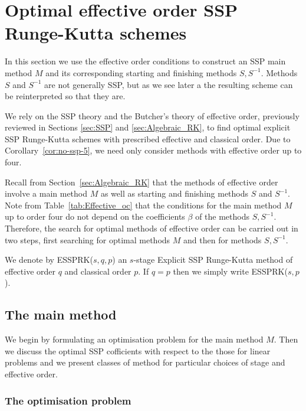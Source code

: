 \section{Optimal effective order SSP Runge-Kutta schemes}\label{sec:Optimal_ESSPRK}
In this section we use the effective order conditions to
construct an SSP main method $M$ and its corresponding starting and finishing
methods $S,S^{-1}$.  Methods $S$ and $S^{-1}$ are not generally SSP, but as we see later a the resulting scheme can be reinterpreted so that they are.

We rely on the SSP theory and the Butcher's theory of effective order,
previously reviewed in Sections \ref{sec:SSP} and \ref{sec:Algebraic_RK}, to
find optimal explicit SSP Runge-Kutta schemes with prescribed effective and classical order.  Due to Corollary~\ref{cor:no-ssp-5}, we need only consider methods with effective order 
up to four.

Recall from Section~\ref{sec:Algebraic_RK} that the methods of effective order involve
a main method $M$ as well as starting and finishing methods $S$ and $S^{-1}$.
Note from Table~\ref{tab:Effective_oc} that the conditions for the main method $M$
up to order four do not depend on the coefficients $\beta$ of the methods $S,S^{-1}$. 
Therefore, the search for optimal methods of effective order can be carried out in
two steps, first searching for optimal methods $M$ and then for methods $S,S^{-1}$.


We denote by ESSPRK($s,q,p$) an $s$-stage Explicit SSP Runge-Kutta method of
effective order $q$ and classical order $p$. If $q=p$ then we simply write ESSPRK($s,p$). 

\subsection{The main method}\label{subsection3.1}

We begin by formulating an optimisation problem for the main method $M$. Then we discuss 
the optimal SSP cofficients with respect to the those for linear problems and we present classes of method for particular choices of stage and effective order.

\subsubsection{The optimisation problem\label{subsection3.1.1}}


